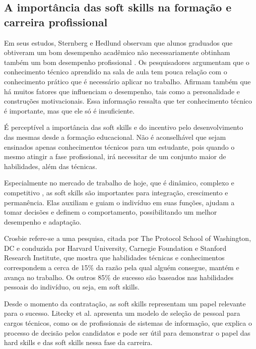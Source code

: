 	
\subsection{A importância das soft skills na formação e carreira profissional}
\label{subsec:ss-importance}

Em seus estudos, Sternberg e Hedlund observam que alunos graduados que obtiveram um bom desempenho acadêmico não necessariamente obtinham também um bom desempenho profissional \cite{sternberg:02}. Os pesquisadores argumentam que o conhecimento técnico aprendido na sala de aula tem pouca relação com o conhecimento prático que é necessário aplicar no trabalho. Afirmam também que há muitos fatores que influenciam o desempenho, tais como a personalidade e construções motivacionais. Essa informação ressalta que ter conhecimento técnico é importante, mas que ele só é insuficiente. 

É perceptível a importância das soft skills e do incentivo pelo desenvolvimento das mesmas desde a formação educacional. Não é aconselhável que sejam ensinados apenas conhecimentos técnicos para um estudante, pois quando o mesmo atingir a fase profissional, irá necessitar de um conjunto maior de habilidades, além das técnicas.

Especialmente no mercado de trabalho de hoje, que é dinâmico, complexo e competitivo \cite{joseph:10}, as soft skills são importantes para integração, crescimento e permanência. Elas auxiliam e guiam o indivíduo em suas funções, ajudam a tomar decisões e definem o comportamento, possibilitando um melhor desempenho e adaptação. 

Crosbie \cite{crosbie:05} refere-se a uma pesquisa, citada por The Protocol School of Washington, DC e conduzida por Harvard University, Carnegie Foundation e Stanford Research Institute, que mostra que habilidades técnicas e conhecimentos correspondem a cerca de 15\% da razão pela qual alguém consegue, mantém e avança no trabalho. Os outros 85\% de sucesso são baseados nas habilidades pessoais do indivíduo, ou seja, em soft skills.

Desde o momento da contratação, as soft skills representam um papel relevante para o sucesso. Litecky et al.\cite{litecky:04} apresenta um modelo de seleção de pessoal para cargos técnicos, como os de profissionais de sistemas de informação, que explica o processo de decisão pelos candidatos e pode ser útil para demonstrar o papel das hard skills e das soft skills nessa fase da carreira.

